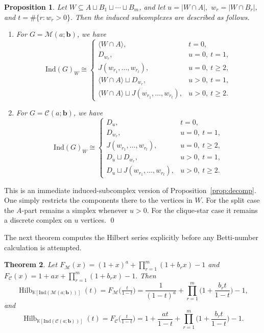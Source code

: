 \documentclass[12pt]{article}
\renewenvironment{proof}{{\bf \noindent Proof.}}{\qed}
\newtheorem{theorem}{Theorem}[section]
\newtheorem{proposition}[theorem]{Proposition}
\theoremstyle{definition}
\theoremstyle{remark}
\DeclareMathOperator{\Hilb}{Hilb}
\newcommand{\kk}{\mathbb{K}}
\newcommand{\MM}{\mathcal{M}}
\newcommand{\CC}{\mathcal{C}}
\newcommand{\ind}{\mathrm{Ind}}
\newcommand{\bk}[1]{\mathbf{#1}}
\begin{document}
	\begin{proposition}\label{prop:induced-models}
		Let $W\subseteq A\sqcup B_1\sqcup\cdots\sqcup B_m$, and let
		$ u=|W\cap A|, $ $ 	w_r=|W\cap B_r|, $ and $t=\#\{r:w_r>0\}. $ 	Then the induced subcomplexes are described as follows.
		
		\begin{enumerate}[label=\textup{(\roman*)},noitemsep]
			\item For $G=\MM(a;\bk{b})$, we have
			$$
			\ind(G)_W \cong
			\begin{cases}
				\langle W\cap A\rangle, & t=0,\\
				D_{w_r}, & u=0,\ t=1,\\
				J(w_{r_1},\dots,w_{r_t}), & u=0,\ t\geq 2,\\
				\langle W\cap A\rangle \sqcup D_{w_r}, & u>0,\ t=1,\\
				\langle W\cap A\rangle \sqcup J(w_{r_1},\dots,w_{r_t}), & u>0,\ t\geq 2.
			\end{cases}
			$$
			
			\item For $G=\CC(a;\bk{b})$, we have
			$$
			\ind(G)_W \cong
			\begin{cases}
				D_u, & t=0,\\
				D_{w_r}, & u=0,\ t=1,\\
				J(w_{r_1},\dots,w_{r_t}), & u=0,\ t\geq 2,\\
				D_u\sqcup D_{w_r}, & u>0,\ t=1,\\
				D_u\sqcup J(w_{r_1},\dots,w_{r_t}), & u>0,\ t\geq 2.
			\end{cases}
			$$
		\end{enumerate}
	\end{proposition}
	
	\begin{proof}
		This is an immediate induced-subcomplex version of Proposition~\ref{prop:decomp}. One simply restricts the components there to the vertices in $W$. For the split case the $A$-part remains a simplex whenever $u>0$. For the clique-star case it remains a discrete complex on $u$ vertices.
	\end{proof}
	
	 \medskip The next theorem computes the Hilbert series explicitly before any Betti-number calculation is attempted.
	
	\begin{theorem}\label{thm:Hilbert}
		Let
		$ F_{\MM}(x)=(1+x)^a+\prod_{r=1}^m (1+b_r x)-1 $
		and
		$ F_{\CC}(x)=1+ax+\prod_{r=1}^m (1+b_r x)-1. $
		Then
		$$
		\Hilb_{\kk[\ind(\MM(a;\bk{b}))]}(t)=F_{\MM}\Big(\tfrac{t}{1-t}\Big)
		=\frac{1}{(1-t)^a}+\prod_{r=1}^m\Big(1+\frac{b_r t}{1-t}\Big)-1,
		$$
		and
		$$
		\Hilb_{\kk[\ind(\CC(a;\bk{b}))]}(t)=F_{\CC}\Big(\tfrac{t}{1-t}\Big)
		=1+\frac{at}{1-t}+\prod_{r=1}^m\Big(1+\frac{b_r t}{1-t}\Big)-1.
		$$
	\end{theorem}
	
\end{document}
